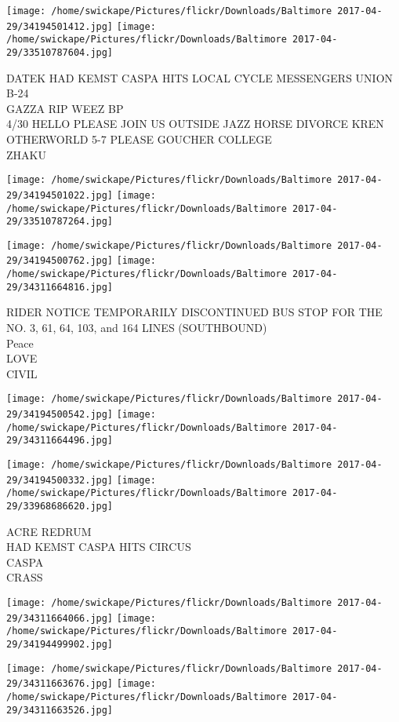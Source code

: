 \documentclass[10pt,letterpaper]{article}
\begin{document}
\texttt{[image: /home/swickape/Pictures/flickr/Downloads/Baltimore 2017-04-29/34194501412.jpg]}
\texttt{[image: /home/swickape/Pictures/flickr/Downloads/Baltimore 2017-04-29/33510787604.jpg]}

DATEK HAD KEMST CASPA HITS LOCAL CYCLE MESSENGERS UNION B{-}24\\
GAZZA RIP WEEZ BP\\
4/30 HELLO PLEASE JOIN US OUTSIDE JAZZ HORSE DIVORCE KREN OTHERWORLD 5{-}7 PLEASE GOUCHER COLLEGE\\
ZHAKU
\pagebreak

\texttt{[image: /home/swickape/Pictures/flickr/Downloads/Baltimore 2017-04-29/34194501022.jpg]}
\texttt{[image: /home/swickape/Pictures/flickr/Downloads/Baltimore 2017-04-29/33510787264.jpg]}

\texttt{[image: /home/swickape/Pictures/flickr/Downloads/Baltimore 2017-04-29/34194500762.jpg]}
\texttt{[image: /home/swickape/Pictures/flickr/Downloads/Baltimore 2017-04-29/34311664816.jpg]}

RIDER NOTICE TEMPORARILY DISCONTINUED BUS STOP FOR THE NO. 3, 61, 64, 103, and 164 LINES (SOUTHBOUND)\\
Peace\\
LOVE\\
CIVIL
\pagebreak

\texttt{[image: /home/swickape/Pictures/flickr/Downloads/Baltimore 2017-04-29/34194500542.jpg]}
\texttt{[image: /home/swickape/Pictures/flickr/Downloads/Baltimore 2017-04-29/34311664496.jpg]}

\texttt{[image: /home/swickape/Pictures/flickr/Downloads/Baltimore 2017-04-29/34194500332.jpg]}
\texttt{[image: /home/swickape/Pictures/flickr/Downloads/Baltimore 2017-04-29/33968686620.jpg]}

ACRE REDRUM\\
HAD KEMST CASPA HITS CIRCUS\\
CASPA\\
CRASS
\pagebreak

\texttt{[image: /home/swickape/Pictures/flickr/Downloads/Baltimore 2017-04-29/34311664066.jpg]}
\texttt{[image: /home/swickape/Pictures/flickr/Downloads/Baltimore 2017-04-29/34194499902.jpg]}

\texttt{[image: /home/swickape/Pictures/flickr/Downloads/Baltimore 2017-04-29/34311663676.jpg]}
\texttt{[image: /home/swickape/Pictures/flickr/Downloads/Baltimore 2017-04-29/34311663526.jpg]}
\end{document}
